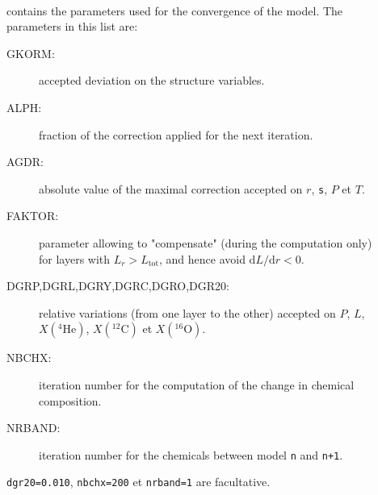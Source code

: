 \documentclass[11pt]{article}
\def\el#1#2{\ensuremath{^{#1}\text{#2}}}
\def\he{\el{4}{He}}
\def\carb{\el{12}{C}}
\def\oxy{\el{16}{O}}
\begin{document}
\begin{description}
  \item[] ~\\ contains the parameters used for the convergence of the model. The parameters in this list are:
    \begin{description}
      \item[GKORM:] accepted deviation on the structure variables.
      \item[ALPH:] fraction of the correction applied for the next iteration.
      \item[AGDR:] absolute value of the maximal correction accepted on $r$, \texttt{s}, $P$ et $T$.
      \item[FAKTOR:] parameter allowing to "compensate" (during the computation only) for  layers with $L_r>L_\text{tot}$, and hence avoid $\text{d}L/\text{d}r<0$.
      \item[DGRP,DGRL,DGRY,DGRC,DGRO,DGR20:] relative variations (from one layer to the other) accepted on $P$, $L$, $X(\he)$, $X(\carb)$ et $X(\oxy)$.
      \item[NBCHX:]  iteration number for the computation of the change in chemical composition.
      \item[NRBAND:] iteration number for the chemicals between model \texttt{n} and \texttt{n+1}.
    \end{description}
    \texttt{dgr20=0.010}, \texttt{nbchx=200} et \texttt{nrband=1} are facultative.


\end{description}
\end{document}
